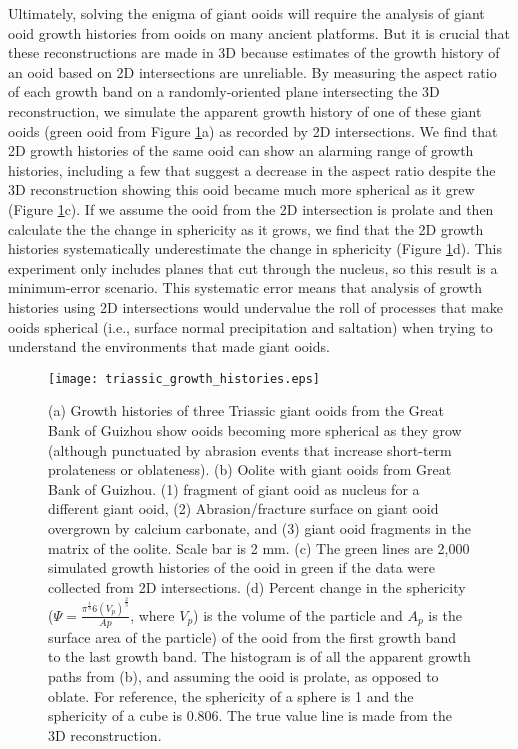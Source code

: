 \documentclass[draft]{agujournal2019}
\begin{document}
Ultimately, solving the enigma of giant ooids will require the analysis of giant ooid growth histories from ooids on many ancient platforms. But it is crucial that these reconstructions are made in 3D because estimates of the growth history of an ooid based on 2D intersections are unreliable. By measuring the aspect ratio of each growth band on a randomly-oriented plane intersecting the 3D reconstruction, we simulate the apparent growth history of one of these giant ooids (green ooid from Figure \ref{fig:AR_Growth}a) as recorded by 2D intersections. We find that 2D growth histories of the same ooid can show an alarming range of growth histories, including a few that suggest a decrease in the aspect ratio despite the 3D reconstruction showing this ooid became much more spherical as it grew (Figure \ref{fig:AR_Growth}c). If we assume the ooid from the 2D intersection is prolate and then calculate the the change in sphericity as it grows, we find that the 2D growth histories systematically underestimate the change in sphericity (Figure \ref{fig:AR_Growth}d). This experiment only includes planes that cut through the nucleus, so this result is a minimum-error scenario. This systematic error means that analysis of growth histories using 2D intersections would undervalue the roll of processes that make ooids spherical (i.e., surface normal precipitation and saltation) when trying to understand the environments that made giant ooids. 



\begin{figure}
    \centering
    \texttt{[image: triassic\_growth\_histories.eps]}
    \caption{(a) Growth histories of three Triassic giant ooids from the Great Bank of Guizhou show ooids becoming more spherical as they grow (although punctuated by abrasion events that increase short-term prolateness or oblateness). (b) Oolite with giant ooids from Great Bank of Guizhou. (1) fragment of giant ooid as nucleus for a different giant ooid, (2) Abrasion/fracture surface on giant ooid overgrown by calcium carbonate, and (3) giant ooid fragments in the matrix of the oolite. Scale bar is 2 mm.
    (c) The green lines are 2,000 simulated growth histories of the ooid in green if the data were collected from 2D intersections. (d) Percent change in the sphericity (\(\Psi = \frac{\pi^\frac{1}{3}6(V_{p})^{\frac{2}{3}}}{A{p}}\), where \(V_{p}\)) is the volume of the particle and \(A_{p}\) is the surface area of the particle) of the ooid from the first growth band to the last growth band. The histogram is of all the apparent growth paths from (b), and assuming the ooid is prolate, as opposed to oblate. For reference, the sphericity of a sphere is 1 and the sphericity of a cube is 0.806. The true value line is made from the 3D reconstruction.}
    \label{fig:AR_Growth}
\end{figure}
\end{document}
